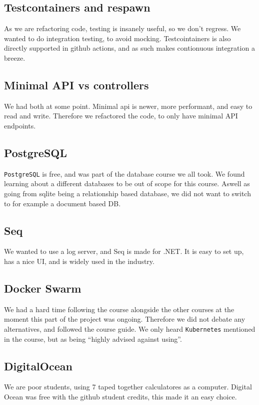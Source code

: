 \subsection{Testcontainers and respawn}
As we are refactoring code, testing is insanely 
useful, so we don't regress. 
We wanted to do integration testing, to avoid mocking. 
Testcointainers is also directly supported in github actions, 
and as such makes contionuous integration a breeze.

\subsection{Minimal API vs controllers}
We had both at some point. Minimal api is newer, more performant, 
and easy to read and write. Therefore we refactored the code, 
to only have minimal API endpoints.

\subsection{PostgreSQL}
\texttt{PostgreSQL} is free, and was part of the database course we all
took. We found learning about a different databases to be 
out of scope for this course. Aswell as going from sqlite 
being a relationship based database, we did not want to 
switch to for example a document based DB.

\subsection{Seq}
We wanted to use a log server, and Seq is made for .NET.
It is easy to set up, has a nice UI, and is widely used 
in the industry.

\subsection{Docker Swarm}
We had a hard time following the course alongside the other 
courses at the moment this part of the project was ongoing.
Therefore we did not debate any alternatives, and followed 
the course guide. We only heard \texttt{Kubernetes} mentioned in 
the course, but as being ``highly advised against using''.

\subsection{DigitalOcean}
We are poor students, using 7 taped together calculatores 
as a computer. Digital Ocean was free with the github student 
credits, this made it an easy choice.
